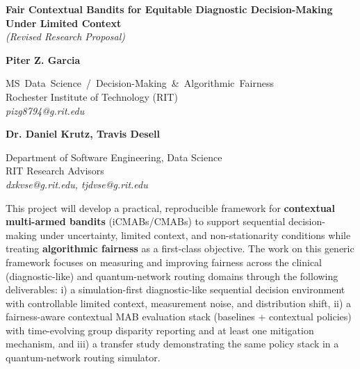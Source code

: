 \documentclass[12pt]{article}
\begin{document}
\pagestyle{empty}

\noindent
\begin{center}
{\large\bf Fair Contextual Bandits for Equitable Diagnostic Decision-Making\\ Under Limited Context}\\[0.2em]
{\large\textit{(Revised Research Proposal)}}
\end{center}

\begin{center}
\begin{minipage}{0.48\linewidth}
\begin{center}
{\bf Piter Z. Garcia}\\
\begin{small}
{\footnotesize\mbox{MS Data Science / Decision-Making \& Algorithmic~Fairness}}\\
Rochester Institute of Technology (RIT)\\
{\it pizg8794@g.rit.edu}
\end{small}
\end{center}
\end{minipage}
\begin{minipage}{0.48\linewidth}
\begin{center}
{\bf Dr. Daniel Krutz, Travis Desell}\\
\begin{small}
Department of Software Engineering, Data Science\\
RIT Research Advisors\\
{\it dxkvse@g.rit.edu, tjdvse@g.rit.edu}
\end{small}
\end{center}
\end{minipage}
\end{center}

\noindent
This project will develop a practical, reproducible framework for {\bf contextual multi-armed bandits} (iCMABs/\allowbreak{}CMABs)
to support sequential decision-making under uncertainty, limited context, and non-stationarity conditions while treating {\bf algorithmic fairness} as a first-class objective.
The work on this generic framework focuses on measuring and improving fairness across the clinical (diagnostic-like) and quantum-network routing domains through the following deliverables:
i) a simulation-first diagnostic-like sequential decision environment with controllable limited context, measurement noise, and distribution shift,
ii) a fairness-aware contextual MAB evaluation stack (baselines + contextual policies) with time-evolving group disparity reporting and at least one mitigation mechanism,
and iii) a transfer study demonstrating the same policy stack in a quantum-network routing simulator.
\end{document}
